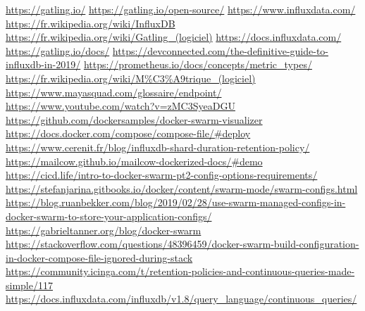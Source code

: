 \documentclass[oneside,12pt]{report}
\begin{document}
\begin{flushleft}

\url{https://gatling.io/}\newline
\url{https://gatling.io/open-source/}\newline
\url{https://www.influxdata.com/}\newline
\url{https://fr.wikipedia.org/wiki/InfluxDB}\newline
\url{https://fr.wikipedia.org/wiki/Gatling_(logiciel)}\newline
\url{https://docs.influxdata.com/}\newline
\url{https://gatling.io/docs/}\newline
\url{https://devconnected.com/the-definitive-guide-to-influxdb-in-2019/}\newline
\url{https://prometheus.io/docs/concepts/metric_types/}\newline
\url{https://fr.wikipedia.org/wiki/M\%C3\%A9trique_(logiciel)}\newline
\url{https://www.mayasquad.com/glossaire/endpoint/}\newline
\url{https://www.youtube.com/watch?v=zMC3SyeaDGU}\newline
\url{https://github.com/dockersamples/docker-swarm-visualizer}\newline
\url{https://docs.docker.com/compose/compose-file/#deploy}\newline
\url{https://www.cerenit.fr/blog/influxdb-shard-duration-retention-policy/}\newline
\url{https://mailcow.github.io/mailcow-dockerized-docs/#demo}\newline
\url{https://cicd.life/intro-to-docker-swarm-pt2-config-options-requirements/}\newline
\url{https://stefanjarina.gitbooks.io/docker/content/swarm-mode/swarm-configs.html}\newline
\url{https://blog.ruanbekker.com/blog/2019/02/28/use-swarm-managed-configs-in-docker-swarm-to-store-your-application-configs/}\newline
\url{https://gabrieltanner.org/blog/docker-swarm}\newline
\url{https://stackoverflow.com/questions/48396459/docker-swarm-build-configuration-in-docker-compose-file-ignored-during-stack}\newline
\url{https://community.icinga.com/t/retention-policies-and-continuous-queries-made-simple/117}\newline
\url{https://docs.influxdata.com/influxdb/v1.8/query_language/continuous_queries/}\newline

\end{flushleft}
\end{document}
